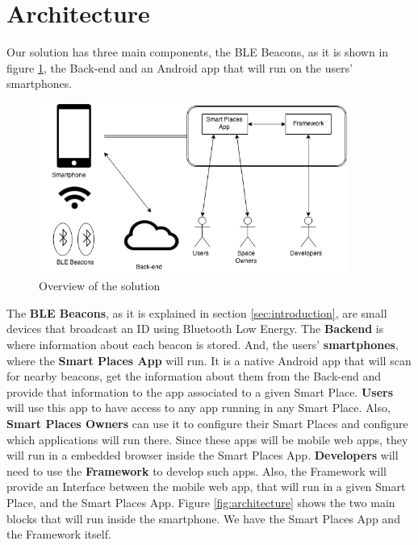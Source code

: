 
% 
% 


\section{Architecture}
\label{sec:architecture}
Our solution has three main components,
the BLE Beacons, as it is shown in figure 
\ref{fig:overview_architecture}, 
the Back-end and an Android app
that will run on the users' smartphones.
\begin{figure}[!ht]
  \centering
    \includegraphics[width=0.9\textwidth]{img/overview_architecture}
    \caption{Overview of the solution}
    \label{fig:overview_architecture}
\end{figure}
The \textbf{BLE Beacons}, as it is explained in section 
\ref{sec:introduction}, are small devices that broadcast
an ID using Bluetooth Low Energy. The \textbf{Backend} is where information about each beacon is stored. 
And, the users'
\textbf{smartphones}, where the \textbf{Smart Places App} will run.
It is a native Android app that will scan for nearby beacons,
get the information about them from the Back-end and
provide that information to the app associated to a 
given Smart Place.
\textbf{Users} will use this app to have access
to any app running in any Smart Place.
Also, \textbf{Smart Places Owners} can use it to configure
their Smart Places and configure which applications
will run there.
Since these apps will be mobile web apps, they will run
in a embedded browser inside the Smart Places App.
\textbf{Developers} will need to use the \textbf{Framework} to
develop such apps. Also, the Framework will provide an
Interface between the mobile web app, that will run
in a given Smart Place, and the Smart Places App.
Figure \ref{fig:architecture} shows the two main
blocks that will run inside the smartphone.
We have the Smart Places App and the Framework itself.

